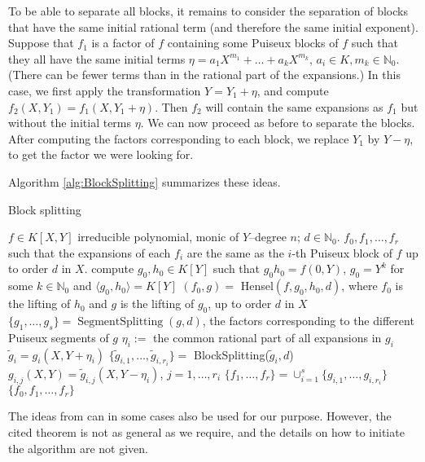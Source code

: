 \documentclass[a4paper,11pt]{amsart}%
\theoremstyle{definition}
\theoremstyle{plain}
\theoremstyle{remark}
\DeclareMathOperator{\SegmentSplitting}{SegmentSplitting}
\newcommand{\N}{{\mathbb N}}
\begin{document}
To be able to separate all blocks, it remains to consider the separation of
blocks that have the same initial rational term (and therefore the same
initial exponent). Suppose that $f_{1}$ is a factor of $f$ containing some
Puiseux blocks of $f$ such that they all have the same initial terms $\eta=
a_{1} X^{m_{1}} + \dots+a_{k} X^{m_{k}}$, $a_{i} \in K, m_{k} \in{\mathbb{N}%
}_{0}$. (There can be fewer terms than in the rational part of the
expansions.) In this case, we first apply the transformation $Y = Y_{1} +
\eta$, and compute $f_{2}(X,Y_{1}) = f_{1}(X, Y_{1} + \eta)$. Then $f_{2}$
will contain the same expansions as $f_{1}$ but without the initial terms
$\eta$. We can now proceed as before to separate the blocks. After computing
the factors corresponding to each block, we replace $Y_{1}$ by $Y - \eta$, to
get the factor we were looking for.

Algorithm \ref{alg:BlockSplitting} summarizes these ideas.

\begin{algorithm}                      %
\caption{Block splitting}          %
\label{alg:BlockSplitting}
\begin{algorithmic}[1]
\REQUIRE $f \in K[X,Y]$ irreducible polynomial, monic of $Y$--degree $n$; $d \in \N_0$.
\ENSURE $f_0, f_1, \dots, f_r$ such that the expansions of each $f_i$ are the same as the $i$-th Puiseux block of $f$ up to order $d$ in $X$.
\STATE compute $g_0, h_0 \in K[Y]$ such that $g_0h_0 = f(0, Y)$, $g_0 = Y^k$ for some $k \in \N_0$ and $\langle g_0, h_0 \rangle = K[Y]$
\STATE $(f_0, g) = $ Hensel$(f, g_0, h_0, d)$, where $f_0$ is the lifting of $h_0$ and $g$ is the lifting of $g_0$, up to order $d$ in $X$
\STATE $\{g_1, \dots, g_s\} = \SegmentSplitting(g, d)$, the factors corresponding to the different Puiseux segments of $g$
\STATE $\eta_i := $ the common rational part of all expansions in $g_i$
\STATE $\tilde g_i = g_i(X, Y + \eta_i)$
\STATE $\{\tilde g_{i,1}, \dots, \tilde g_{i, r_i}\} = $ BlockSplitting($\tilde g_i, d$)
\STATE $g_{i,j}(X,Y) = \tilde g_{i, j}(X, Y - \eta_i)$, $j = 1, \dots, r_i$
\ENDFOR
\STATE $\{f_1, \dots, f_r\} = \cup_{i = 1}^s \{g_{i,1}, \dots, g_{i, r_i}\}$
\RETURN $\{f_0, f_1, \dots, f_r\}$
\end{algorithmic}
\end{algorithm}


The ideas from \cite[Theorem 5.1.20]{JP} can in some cases also be used for
our purpose. However, the cited theorem is not as general as we require, and
the details on how to initiate the algorithm are not given.
\end{document}
